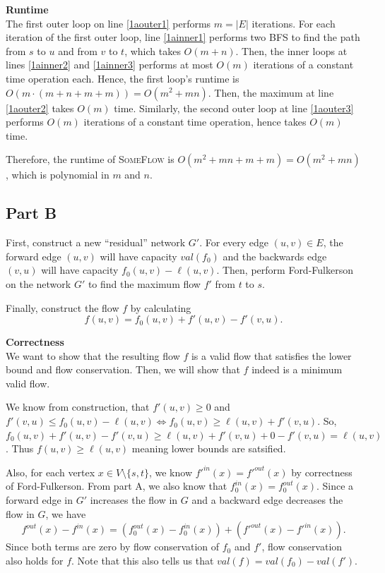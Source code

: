 \documentclass[11pt]{exam}
\begin{document}
\noindent \textbf{Runtime}\\

The first outer loop on line \ref{1aouter1} performs $m = |E|$
iterations. For each iteration of the first outer loop, line
\ref{1ainner1} performs two BFS to find the path from $ s $ to $ u $
and from $ v $ to $ t $, which takes $ O(m + n) $. Then, the inner
loops at lines \ref{1ainner2} and \ref{1ainner3} performs at most $
O(m) $ iterations of a constant time operation each. Hence, the first
loop's runtime is $ O(m \cdot (m + n + m + m)) = O(m^2 + mn) $. Then,
the maximum at line \ref{1aouter2} takes $ O(m) $ time. Similarly,
the second outer loop at line \ref{1aouter3} performs $ O(m) $
iterations of a constant time operation, hence takes $ O(m) $ time.

Therefore, the runtime of \textsc{SomeFlow} is $ O(m^2 + mn + m + m)
= O(m^2 + m n) $, which is polynomial in $m$ and $n$.

\subsection{Part B}

First, construct a new ``residual'' network $G'$. For every edge
$(u,v) \in E$, the forward edge $(u,v)$ will have capacity
$\mathit{val}(f_0)$ and the backwards edge $(v,u)$ will have capacity
$f_0(u,v)-\ell(u,v)$. Then, perform Ford-Fulkerson on the network
$G'$ to find the maximum flow $f'$ from $t$ to $s$.

Finally, construct the flow $f$ by calculating
\[
  f(u,v) = f_0(u,v) + f'(u,v)
  - f'(v,u).
\]

\noindent \textbf{Correctness}\\

We want to show that the resulting flow $f$ is a valid flow
that satisfies the lower bound and flow conservation. Then, we will
show that $f$ indeed is a minimum valid flow.

We know from construction, that $f'(u, v) \geq 0$ and $f'(v, u) \leq
f_0 (u, v) - \ell (u, v) \Leftrightarrow f_0 (u, v) \geq \ell(u, v) +
f'(v, u)$. So, $f_0 (u, v) + f'(u, v) - f'(v, u) \geq \ell(u, v) +
f'(v, u) + 0 - f'(v, u) = \ell(u, v)$.
Thus $f (u, v) \geq \ell(u, v)$ meaning lower bounds are satsified.

Also, for each vertex $x \in V \setminus \{s, t\}$, we know
${f'}^\mathit{in} (x) = {f'}^\mathit{out} (x)$ by correctness of
Ford-Fulkerson. From part A, we also know that $f_0^\mathit{in} (x) =
f_0^\mathit{out} (x)$.
Since a forward edge in $G'$ increases the flow in $G$ and a backward
edge decreases the flow in $G$, we have
\[
  f^\mathit{out}(x)-f^\mathit{in}(x) =
  (f_0^\mathit{out}(x)-f_0^\mathit{in}(x)) +
  ({f'}^\mathit{out}(x)-{f'}^\mathit{in}(x)).
\]
Since both terms are zero by flow conservation of $f_0$ and $f'$,
flow conservation also holds for $f$. Note that this also tells us
that $\mathit{val}(f) = \mathit{val}(f_0) - \mathit{val}(f')$.
\end{document}
